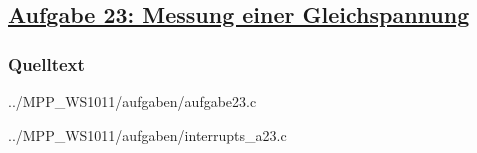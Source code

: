 \subsection*
{\href{http://cst.mi.fu-berlin.de/intern/19606-P-MPP/Aufgaben/040801.html}
{Aufgabe 23: Messung einer Gleichspannung}}

\subsubsection*{Quelltext}


{../MPP_WS1011/aufgaben/aufgabe23.c}


{../MPP_WS1011/aufgaben/interrupts_a23.c}
